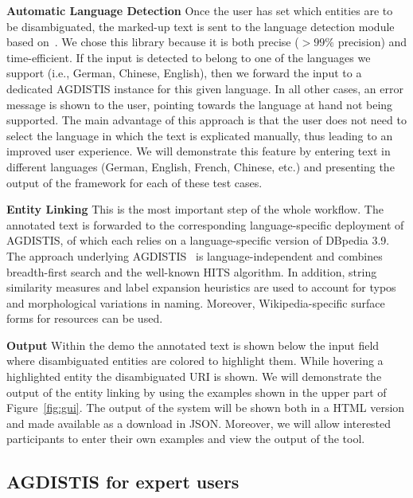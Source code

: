 \noindent\textbf{Automatic Language Detection}
Once the user has set which entities are to be disambiguated, the marked-up text is sent to the language detection module based on~\cite{nakatani2010langdetect}.
We chose this library because it is both precise ($>99\%$ precision) and time-efficient.
If the input is detected to belong to one of the languages we support (i.e., German, Chinese, English), then we forward the input to a dedicated AGDISTIS instance for this given language.
In all other cases, an error message is shown to the user, pointing towards the language at hand not being supported.
The main advantage of this approach is that the user does not need to select the language in which the text is explicated manually, thus leading to an improved user experience. 
We will demonstrate this feature by entering text in different languages (German, English, French, Chinese, etc.) and presenting the output of the framework for each of these test cases.

\noindent\textbf{Entity Linking} 
This is the most important step of the whole workflow.
The annotated text is forwarded to the corresponding language-specific deployment of AGDISTIS, of which each relies on a language-specific version of DBpedia 3.9. 
The approach underlying AGDISTIS~\cite{AGDISTIS_ISWC} is language-independent and combines breadth-first search and the well-known HITS algorithm. 
In addition, string similarity measures and label expansion heuristics are used to account for typos and morphological variations in naming.
Moreover, Wikipedia-specific surface forms for resources can be used. 

\noindent\textbf{Output}
Within the demo the annotated text is shown below the input field where disambiguated entities are colored to highlight them. 
While hovering a highlighted entity the disambiguated URI is shown.
We will demonstrate the output of the entity linking by using the examples shown in the upper part of Figure~\ref{fig:gui}. 
The output of the system will be shown both in a HTML version and made available as a download in JSON. 
Moreover, we will allow interested participants to enter their own examples and view the output of the tool.

\subsection{AGDISTIS for expert users}

